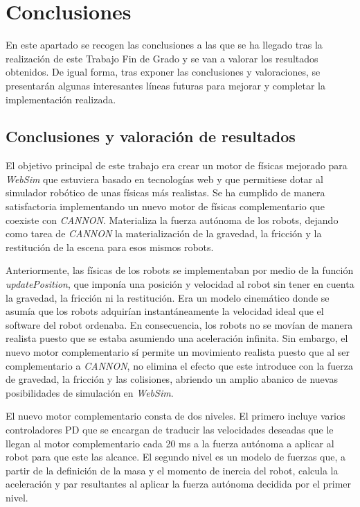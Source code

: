 \chapter{Conclusiones}
\label{chap:conclusiones} 
En este apartado se recogen las conclusiones a las que se ha llegado tras la realización de este Trabajo Fin de Grado y se van a valorar los resultados obtenidos. De igual forma, tras exponer las conclusiones y valoraciones, se presentarán algunas interesantes líneas futuras para mejorar y completar la implementación realizada.
   
\section{Conclusiones y valoración de resultados}
El objetivo principal de este trabajo era crear un motor de físicas mejorado para \textit{WebSim} que estuviera basado en tecnologías web y que permitiese dotar al simulador robótico de unas físicas más realistas. Se ha cumplido de manera satisfactoria implementando un nuevo motor de físicas complementario que coexiste con \textit{CANNON}. Materializa la fuerza autónoma de los robots, dejando como tarea de \textit{CANNON} la materialización de la gravedad, la fricción y la restitución de la escena para esos mismos robots.\newline

Anteriormente, las físicas de los robots se implementaban por medio de la función \textit{updatePosition}, que imponía una posición y velocidad al robot sin tener en cuenta la gravedad, la fricción ni la restitución. Era un modelo cinemático donde se asumía que los robots adquirían instantáneamente la velocidad ideal que el software del robot ordenaba. En consecuencia, los robots no se movían de manera realista puesto que se estaba asumiendo una aceleración infinita. Sin embargo, el nuevo motor complementario sí permite un movimiento realista puesto que al ser complementario a \textit{CANNON}, no elimina el efecto que este introduce con la fuerza de gravedad, la fricción y las colisiones, abriendo un amplio abanico de nuevas posibilidades de simulación en \textit{WebSim}. \newline 

El nuevo motor complementario consta de dos niveles. El primero incluye varios controladores PD que se encargan de traducir las velocidades deseadas que le llegan al motor complementario cada 20 ms a la fuerza autónoma a aplicar al robot para que este las alcance. El segundo nivel es un modelo de fuerzas que, a partir de la definición de la masa y el momento de inercia del robot, calcula la aceleración y par resultantes al aplicar la fuerza autónoma decidida por el primer nivel.

